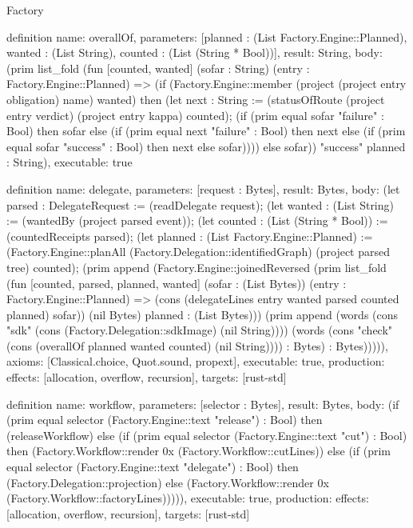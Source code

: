\begin{lexlean}{Factory}
\begin{semanticmodule}
definition{
  name: overallOf,
  parameters: [planned : (List Factory.Engine::Planned), wanted : (List String), counted : (List (String * Bool))],
  result: String,
  body: (prim list_fold (fun [counted, wanted] (sofar : String) (entry : Factory.Engine::Planned) => (if (Factory.Engine::member (project (project entry obligation) name) wanted) then (let next : String := (statusOfRoute (project entry verdict) (project entry kappa) counted); (if (prim equal sofar "failure" : Bool) then sofar else (if (prim equal next "failure" : Bool) then next else (if (prim equal sofar "success" : Bool) then next else sofar)))) else sofar)) "success" planned : String),
  executable: true
}

definition{
  name: delegate,
  parameters: [request : Bytes],
  result: Bytes,
  body: (let parsed : DelegateRequest := (readDelegate request); (let wanted : (List String) := (wantedBy (project parsed event)); (let counted : (List (String * Bool)) := (countedReceipts parsed); (let planned : (List Factory.Engine::Planned) := (Factory.Engine::planAll (Factory.Delegation::identifiedGraph) (project parsed tree) counted); (prim append (Factory.Engine::joinedReversed (prim list_fold (fun [counted, parsed, planned, wanted] (sofar : (List Bytes)) (entry : Factory.Engine::Planned) => (cons (delegateLines entry wanted parsed counted planned) sofar)) (nil Bytes) planned : (List Bytes))) (prim append (words (cons "sdk" (cons (Factory.Delegation::sdkImage) (nil String)))) (words (cons "check" (cons (overallOf planned wanted counted) (nil String)))) : Bytes) : Bytes))))),
  axioms: [Classical.choice, Quot.sound, propext],
  executable: true,
  production: {effects: [allocation, overflow, recursion], targets: [rust-std]}
}

definition{
  name: workflow,
  parameters: [selector : Bytes],
  result: Bytes,
  body: (if (prim equal selector (Factory.Engine::text "release") : Bool) then (releaseWorkflow) else (if (prim equal selector (Factory.Engine::text "cut") : Bool) then (Factory.Workflow::render 0x (Factory.Workflow::cutLines)) else (if (prim equal selector (Factory.Engine::text "delegate") : Bool) then (Factory.Delegation::projection) else (Factory.Workflow::render 0x (Factory.Workflow::factoryLines))))),
  executable: true,
  production: {effects: [allocation, overflow, recursion], targets: [rust-std]}
}
\end{semanticmodule}
\end{lexlean}
